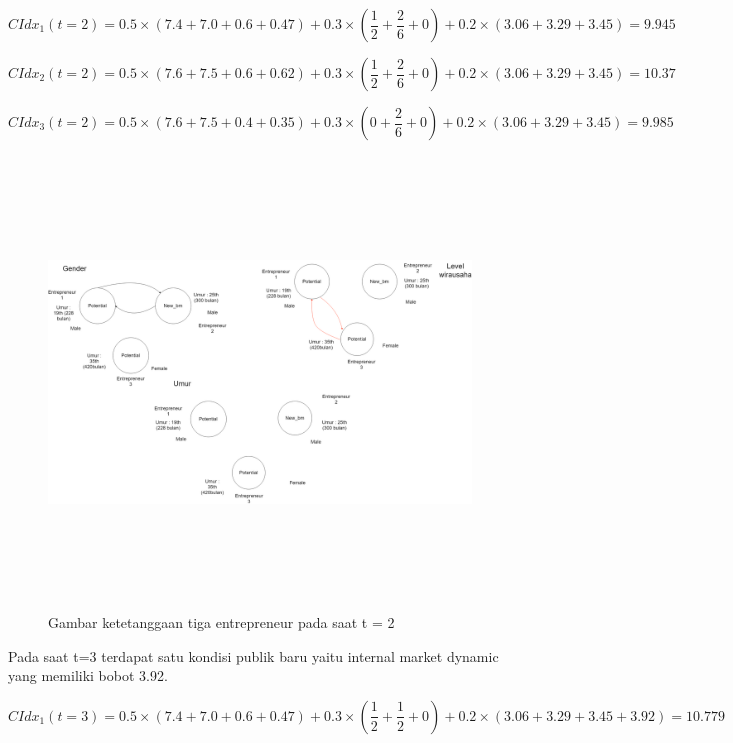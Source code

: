 \begin{equation}
	CIdx_{1}(t=2) = 0.5 \times (7.4 + 7.0 + 0.6 + 0.47) + 0.3 \times (\frac {1} {2} + \frac {2} {6}  + 0) + 0.2 \times (3.06 + 3.29 + 3.45) = 9.945
\end{equation}

\begin{equation}
	CIdx_{2}(t=2) = 0.5 \times (7.6 + 7.5 + 0.6 + 0.62) + 0.3 \times (\frac {1} {2} + \frac {2} {6} + 0) + 0.2 \times (3.06 + 3.29 + 3.45) = 10.37
\end{equation}

\begin{equation}
	CIdx_{3}(t=2) = 0.5 \times (7.6 + 7.5 + 0.4 + 0.35) + 0.3 \times (0 + \frac {2} {6} + 0) + 0.2 \times (3.06 + 3.29+ 3.45) = 9.985
\end{equation}

	\begin{figure} [H]
		\centering  
		\includegraphics[width=18cm, height=12cm]{gambarwirausaha(t=2)} 
		\caption[Gambar ketetanggaan tiga entrepreneur pada saat t = 2]{Gambar ketetanggaan tiga entrepreneur pada saat t = 2} 
		\label{fig:t0} 
	\end{figure}
	
	Pada saat t=3 terdapat satu kondisi publik baru yaitu internal market dynamic yang memiliki bobot 3.92.
	
\begin{equation}
	CIdx_{1}(t=3) = 0.5 \times (7.4 + 7.0 + 0.6 + 0.47) + 0.3 \times (\frac {1} {2} + \frac {1} {2}  + 0) + 0.2 \times (3.06 + 3.29 + 3.45 + 3.92) = 10.779
\end{equation}

